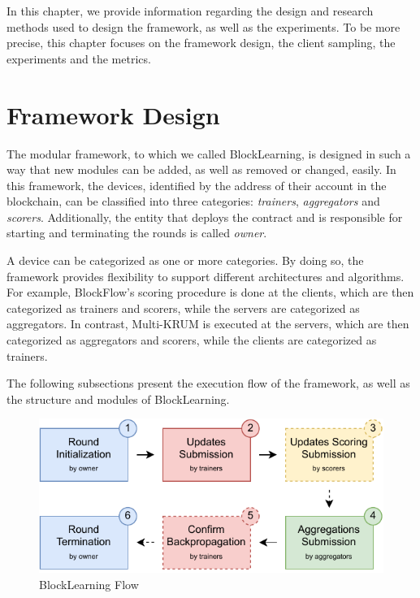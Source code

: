 In this chapter, we provide information regarding the design and research methods used to design the framework, as well as the experiments. To be more precise, this chapter focuses on the framework design, the client sampling, the experiments and the metrics.

\section{Framework Design}\label{meth:framework_design}

The modular framework, to which we called BlockLearning, is designed in such a way that new modules can be added, as well as removed or changed, easily. In this framework, the devices, identified by the address of their account in the blockchain, can be classified into three categories: \textit{trainers}, \textit{aggregators} and \textit{scorers}. Additionally, the entity that deploys the contract and is responsible for starting and terminating the rounds is called \textit{owner}.

A device can be categorized as one or more categories. By doing so, the framework provides flexibility to support different architectures and algorithms. For example, BlockFlow's scoring procedure is done at the clients, which are then categorized as trainers and scorers, while the servers are categorized as aggregators. In contrast, Multi-KRUM is executed at the servers, which are then categorized as aggregators and scorers, while the clients are categorized as trainers.

The following subsections present the execution flow of the framework, as well as the structure and modules of BlockLearning.

\begin{figure}[!ht]
    \centering
    \includegraphics[width=1\textwidth]{graphics/sequence.pdf}
    \caption{BlockLearning Flow}
    \label{fig:blocklearning_steps}
\end{figure}

